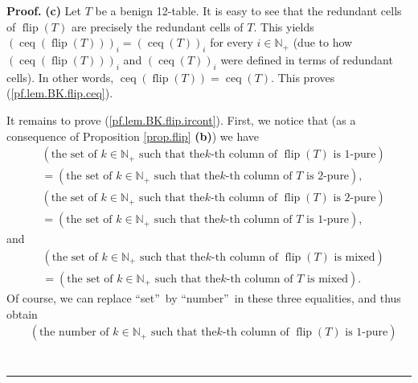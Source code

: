 \documentclass[numbers=enddot,12pt,final,onecolumn,notitlepage]{scrartcl}%
\theoremstyle{definition}
\newenvironment{proof}[1][Proof]{\noindent\textbf{#1.} }{\ \rule{0.5em}{0.5em}}
\newenvironment{verlong}{}{}
\begin{document}
\begin{verlong}
\begin{proof}
\textbf{(c)} Let $T$ be a benign 12-table. It is easy to see that the redundant
cells of $\operatorname*{flip}\left(  T\right)  $ are precisely the redundant
cells of $T$. This yields $\left(  \operatorname*{ceq}\left(
\operatorname*{flip}\left(  T\right)  \right)  \right)  _{i}=\left(
\operatorname*{ceq}\left(  T\right)  \right)  _{i}$ for every $i\in
\mathbb{N}_{+}$ (due to how $\left(  \operatorname*{ceq}\left(
\operatorname*{flip}\left(  T\right)  \right)  \right)  _{i}$ and $\left(
\operatorname*{ceq}\left(  T\right)  \right)  _{i}$ were defined in terms of
redundant cells). In other words, $\operatorname*{ceq}\left(
\operatorname*{flip}\left(  T\right)  \right)  =\operatorname*{ceq}\left(
T\right)  $. This proves (\ref{pf.lem.BK.flip.ceq}).

It remains to prove (\ref{pf.lem.BK.flip.ircont}). First, we notice that (as a
consequence of Proposition \ref{prop.flip} \textbf{(b)}) we have
\begin{align*}
&  \left(  \text{the set of }k\in\mathbb{N}_{+}\text{ such that the
}k\text{-th column of }\operatorname*{flip}\left(  T\right)  \text{ is
1-pure}\right) \\
&  =\left(  \text{the set of }k\in\mathbb{N}_{+}\text{ such that the
}k\text{-th column of }T\text{ is 2-pure}\right)  ,
\end{align*}%
\begin{align*}
&  \left(  \text{the set of }k\in\mathbb{N}_{+}\text{ such that the
}k\text{-th column of }\operatorname*{flip}\left(  T\right)  \text{ is
2-pure}\right) \\
&  =\left(  \text{the set of }k\in\mathbb{N}_{+}\text{ such that the
}k\text{-th column of }T\text{ is 1-pure}\right)  ,
\end{align*}
and%
\begin{align*}
&  \left(  \text{the set of }k\in\mathbb{N}_{+}\text{ such that the
}k\text{-th column of }\operatorname*{flip}\left(  T\right)  \text{ is
mixed}\right) \\
&  =\left(  \text{the set of }k\in\mathbb{N}_{+}\text{ such that the
}k\text{-th column of }T\text{ is mixed}\right)  .
\end{align*}
Of course, we can replace \textquotedblleft set\textquotedblright\ by
\textquotedblleft number\textquotedblright\ in these three equalities, and
thus obtain%
\begin{align*}
&  \left(  \text{the number of }k\in\mathbb{N}_{+}\text{ such that the
}k\text{-th column of }\operatorname*{flip}\left(  T\right)  \text{ is
1-pure}\right) \\

\end{align*}
\end{proof}
\end{verlong}
\end{document}
